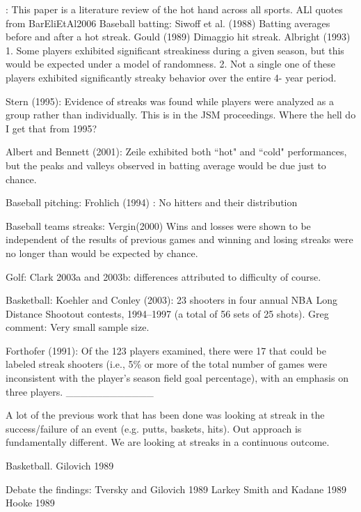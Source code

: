 \documentclass[letterpaper,12pt]{article}\usepackage[]{graphicx}\usepackage[]{color}
\begin{document}
\cite{BarEliEtAl2006}: This paper is a literature review of the hot hand across all sports.  
ALl quotes from BarEliEtAl2006
Baseball batting: 
Siwoff et al. (1988) Batting averages before and after a hot streak.  
Gould (1989) Dimaggio hit streak. 
Albright (1993) 1. Some players exhibited significant streakiness
during a given season, but this would be
expected under a model of randomness.
2. Not a single one of these players exhibited
significantly streaky behavior over the entire 4-
year period.

Stern (1995): Evidence of streaks was found while players were analyzed as a group rather than individually.
This is in the JSM proceedings.  Where the hell do I get that from 1995? 

Albert and Bennett (2001): Zeile exhibited both ``hot" and ``cold"
performances, but the peaks and valleys observed
in batting average would be due just to chance.

Baseball pitching: 
Frohlich (1994) : No hitters and their distribution


Baseball teams streaks: 
Vergin(2000) Wins and losses were shown to be independent of
the results of previous games and winning and
losing streaks were no longer than would be
expected by chance.

Golf:
Clark 2003a and 2003b: differences attributed to difficulty of course.  

Basketball: 
Koehler and Conley (2003): 23 shooters in four annual NBA Long Distance
Shootout contests, 1994–1997 (a total of 56 sets of 25 shots). Greg comment: Very small sample size.

Forthofer (1991): Of the 123 players examined, there were 17 that
could be labeled streak shooters (i.e., 5\% or more
of the total number of games were inconsistent
with the player’s season field goal percentage),
with an emphasis on three players.
____________

A lot of the previous work that has been done was looking at streak in the success/failure of an event (e.g. putts, baskets, hits).  Out approach is fundamentally different.  We are looking at streaks in a continuous outcome.  

Basketball.  
Gilovich 1989

Debate the findings:  
Tversky and Gilovich 1989
Larkey Smith and Kadane 1989
Hooke 1989

\end{document}
